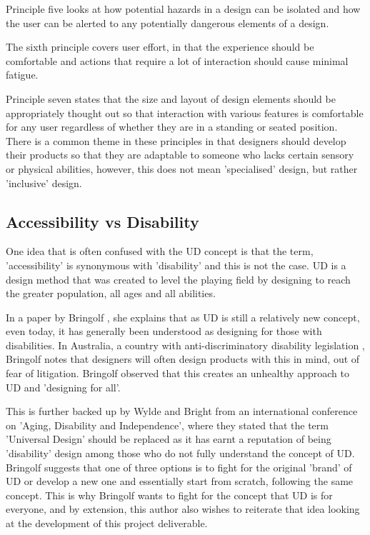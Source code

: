 Principle five looks at how potential hazards in a design can be isolated and how the user can be alerted to any potentially dangerous elements of a design.

The sixth principle covers user effort, in that the experience should be comfortable and actions that require a lot of interaction should cause minimal fatigue.

Principle seven states that the size and layout of design elements should be appropriately thought out so that interaction with various features is comfortable for any user regardless of whether they are in a standing or seated position.
There is a common theme in these principles in that designers should develop their products so that they are adaptable to someone who lacks certain sensory or physical abilities, however, this does not mean 'specialised' design, but rather 'inclusive' design.

\subsection{Accessibility vs Disability}

One idea that is often confused with the UD concept is that the term, 'accessibility' is synonymous with 'disability' and this is not the case.
UD is a design method that was created to level the playing field by designing to reach the greater population, all ages and all abilities.

In a paper by Bringolf \cite{accessible}, she explains that as UD is still a relatively new concept, even today, it has generally been understood as designing for those with disabilities.
In Australia, a country with anti-discriminatory disability legislation \cite{dda1992}, Bringolf notes that designers will often design products with this in mind, out of fear of litigation.
Bringolf observed that this creates an unhealthy approach to UD and 'designing for all'.

This is further backed up by Wylde \cite{accessiblebackup1} and Bright \cite{accessiblebackup2} from an international conference on 'Aging, Disability and Independence', where they stated that the term 'Universal Design' should be replaced as it has earnt a reputation of being 'disability' design among those who do not fully understand the concept of UD.
Bringolf suggests that one of three options is to fight for the original 'brand' of UD or develop a new one and essentially start from scratch, following the same concept.
This is why Bringolf wants to fight for the concept that UD is for everyone, and by extension, this author also wishes to reiterate that idea looking at the development of this project deliverable. %

